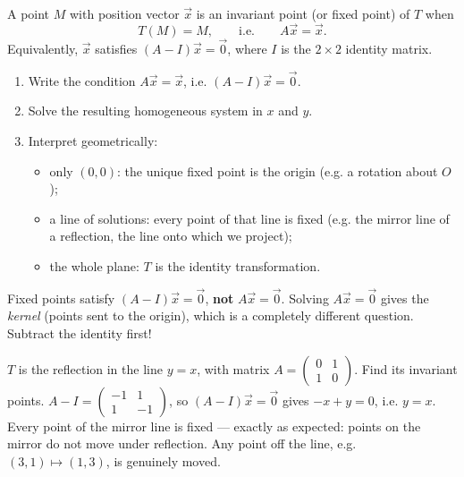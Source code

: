 \documentclass[11pt]{article}
\newcommand{\cle}[1]{{\popxbold\color{popdark}#1}}
\begin{document}
\begin{definition}
A point $M$ with position vector $\vec{x}$ is an \cle{invariant point} (or \cle{fixed point}) of $T$ when
\[
T(M) = M, \qquad \text{i.e.} \qquad A\vec{x} = \vec{x}.
\]
Equivalently, $\vec{x}$ satisfies $(A - I)\vec{x} = \vec{0}$, where $I$ is the $2 \times 2$ identity matrix.
\end{definition}

\begin{methode}
\begin{enumerate}
\item Write the condition $A\vec{x} = \vec{x}$, i.e. $(A - I)\vec{x} = \vec{0}$.
\item Solve the resulting homogeneous system in $x$ and $y$.
\item Interpret geometrically:
\begin{itemize}
\item only $(0,0)$: the unique fixed point is the origin (e.g. a rotation about $O$);
\item a line of solutions: every point of that line is fixed (e.g. the mirror line of a reflection, the line onto which we project);
\item the whole plane: $T$ is the identity transformation.
\end{itemize}
\end{enumerate}
\end{methode}

\begin{attention}
Fixed points satisfy $(A - I)\vec{x} = \vec{0}$, \textbf{not} $A\vec{x} = \vec{0}$. Solving $A\vec{x} = \vec{0}$ gives the \emph{kernel} (points sent to the origin), which is a completely different question. Subtract the identity first!
\end{attention}

\begin{exoresolu}
$T$ is the reflection in the line $y = x$, with matrix $A = \begin{pmatrix} 0 & 1 \\ 1 & 0 \end{pmatrix}$. Find its invariant points.
\tcblower
$A - I = \begin{pmatrix} -1 & 1 \\ 1 & -1 \end{pmatrix}$, so $(A-I)\vec{x} = \vec{0}$ gives $-x + y = 0$, i.e. $y = x$. Every point of the mirror line is fixed — exactly as expected: points on the mirror do not move under reflection. Any point off the line, e.g. $(3,1) \mapsto (1,3)$, is genuinely moved.
\end{exoresolu}
\end{document}
